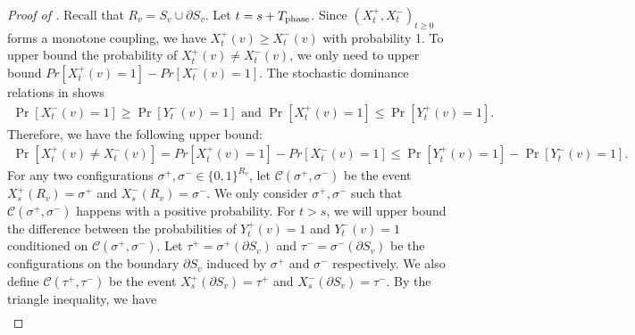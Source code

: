 \documentclass[11pt]{amsart}
\renewcommand{\Pr}{\mathop{\mathrm{Pr}}\nolimits}
\def\+#1{\mathcal{#1}}
\newcommand{\eps}{\varepsilon}
\renewcommand{\P}{\Pr}
\theoremstyle{definition}
\theoremstyle{remark}
\begin{document}
\begin{proof}[Proof of ]
Recall that $R_v=S_v\cup \partial S_v$. Let $t = s + T_{\textnormal{phase}}$.
Since $(X_t^+,X_t^-)_{t \geq 0}$ forms a monotone coupling, we have $X_t^+(v) \geq X_t^-(v)$ with probability 1.
To upper bound the probability of $X_t^+(v) \neq X_t^-(v)$, we only need to upper bound $Pr[X_t^+(v) = 1] - Pr[X_t^-(v) = 1]$.
The stochastic dominance relations in  shows
\begin{align*}
\Pr[X_t^-(v) = 1] \geq \Pr[Y_t^-(v) = 1] \text{ and } \Pr[X_t^+(v) = 1] \leq \Pr[Y_t^+(v) = 1].
\end{align*}
Therefore, we have the following upper bound:
\begin{align}\label{eq:upper-bound-on-X-t-plus-v-neq-X-t-minus-v}
\Pr[X_t^+(v) \neq X_t^-(v)] = Pr[X_t^+(v) = 1] - Pr[X_t^-(v) = 1] \leq \Pr[Y_t^+(v) = 1] - \Pr[Y_t^-(v) = 1].
\end{align}
For any two configurations $\sigma^+,\sigma^-\in \{0,1\}^{R_v}$, let $\mathcal{C}(\sigma^+,\sigma^-)$ be the event
$X_s^+(R_v)=\sigma^+$ and $X_s^-(R_v)=\sigma^-$. 
We only consider $\sigma^+,\sigma^-$ such that $\+C(\sigma^+,\sigma^-)$ happens with a positive probability.
For $t > s$, we will %
upper bound the difference between the probabilities of $Y_t^+(v) = 1$ and $Y_t^-(v) = 1$
conditioned on $\mathcal{C}(\sigma^+,\sigma^-)$. 
Let $\tau^+ = \sigma^+( \partial S_v)$ and $\tau^- = \sigma^-(\partial S_v)$ be the configurations on the boundary $\partial S_v$ induced by $\sigma^+$ and $\sigma^-$ respectively.
We also define $\+C(\tau^+,\tau^-)$ be the event $X_s^+(\partial S_v) = \tau^+$ and $X_s^-(\partial S_v) = \tau^-$.
By the triangle inequality, we have %
\begin{align}

\end{align}
\end{proof}
\end{document}
